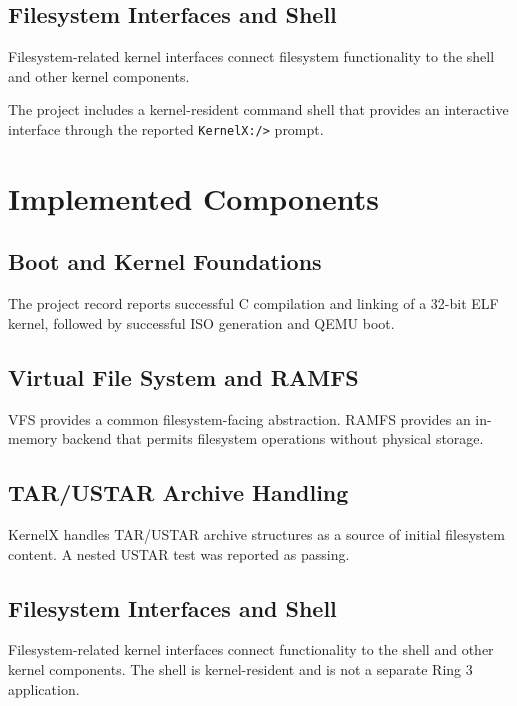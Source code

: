 \documentclass[conference]{IEEEtran}
\begin{document}
\subsection{Filesystem Interfaces and Shell}

Filesystem-related kernel interfaces connect filesystem
functionality to the shell and other kernel components.

The project includes a kernel-resident command shell that
provides an interactive interface through the reported
\texttt{KernelX:/>} prompt.

\section{Implemented Components}

\subsection{Boot and Kernel Foundations}

The project record reports successful C compilation and
linking of a 32-bit ELF kernel, followed by successful ISO
generation and QEMU boot.

\subsection{Virtual File System and RAMFS}

VFS provides a common filesystem-facing abstraction.
RAMFS provides an in-memory backend that permits filesystem
operations without physical storage.

\subsection{TAR/USTAR Archive Handling}

KernelX handles TAR/USTAR archive structures as a source
of initial filesystem content. A nested USTAR test was
reported as passing.

\subsection{Filesystem Interfaces and Shell}

Filesystem-related kernel interfaces connect functionality
to the shell and other kernel components. The shell is
kernel-resident and is not a separate Ring 3 application.
\end{document}
